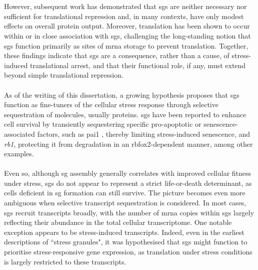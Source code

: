 \\
\\
However, subsequent work has demonstrated that \glspl{sg} are neither necessary nor sufficient for translational repression\cite{kedersha_g3bpcaprin1usp10_2016} and, in many contexts, have only modest effects on overall protein output\cite{mokas_uncoupling_2009}. Moreover, translation has been shown to occur within or in close association with \glspl{sg}, challenging the long-standing notion that \glspl{sg} function primarily as sites of \gls{mrna} storage to prevent translation\cite{mateju_single-molecule_2020}. Together, these findings indicate that \glspl{sg} are a consequence, rather than a cause, of stress-induced translational arrest\cite{mateju_stress_2022}, and that their functional role, if any, must extend beyond simple translational repression.
\\
\\
As of the writing of this dissertation, a growing hypothesis proposes that \glspl{sg} function as fine-tuners of the cellular stress response through selective sequestration of molecules, usually proteins\cite{marcelo_stress_2021}. \glspl{sg} have been reported to enhance cell survival by transiently sequestering specific pro-apoptotic\cite{arimoto_formation_2008, tsai_rhoarock1_2010, fujikawa_stress_2023} or senescence-associated factors, such as \gls{pai1} \cite{omer_stress_2018}, thereby limiting stress-induced senescence, and \textit{\gls{rb1}}, protecting it from degradation in an \gls{rbfox2}-dependent manner\cite{park_stress_2017}, among other examples.
\\
\\
Even so, although \gls{sg} assembly generally correlates with improved cellular fitness under stress\cite{paget_stress_2023}, \glspl{sg} do not appear to represent a strict life-or-death determinant, as cells deficient in \gls{sg} formation can still survive\cite{paget_stress_2023,matheny_rna_2021, matheny_corrigendum_2023}. The picture becomes even more ambiguous when selective transcript sequestration is considered. In most cases, \glspl{sg} recruit transcripts broadly, with the number of \gls{mrna} copies within \glspl{sg} largely reflecting their abundance in the total cellular transcriptome\cite{khong_stress_2017, matheny_transcriptome-wide_2019,matheny_rna_2021,matheny_corrigendum_2023}. One notable exception appears to be stress-induced transcripts\cite{somasekharan_g3bp1-linked_2020, glauninger_transcriptome-wide_2025}. Indeed, even in the earliest descriptions of ``stress granules", it was hypothesised that \glspl{sg} might function to prioritise stress-responsive gene expression, as translation under stress conditions is largely restricted to these transcripts\cite{nover_formation_1983}.
